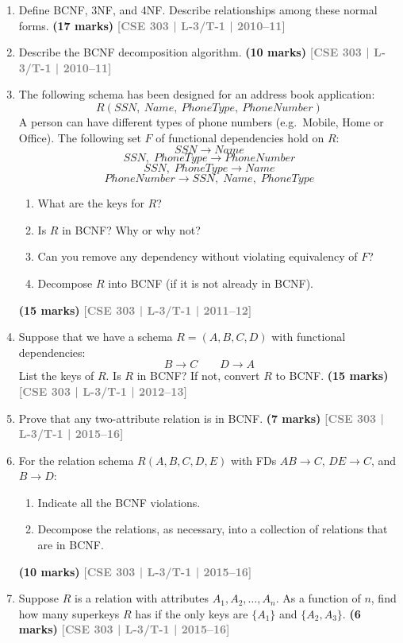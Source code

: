 \documentclass[12pt,a3paper]{article}
\newcommand{\yr}[1]{\hfill\textcolor{gray}{\small\textbf{[#1]}}}
\newcommand{\mk}[1]{\textcolor{orange!70!black}{\small\textbf{(#1 marks)}}}
\begin{document}
\begin{enumerate}

\item Define BCNF, 3NF, and 4NF. Describe relationships among these normal forms.
\mk{17} \yr{CSE 303 | L-3/T-1 | 2010--11}

\item Describe the BCNF decomposition algorithm.
\mk{10} \yr{CSE 303 | L-3/T-1 | 2010--11}

\item The following schema has been designed for an address book application:
\[R(SSN,\ Name,\ PhoneType,\ PhoneNumber)\]
A person can have different types of phone numbers (e.g.\ Mobile, Home or Office). The following set $F$ of functional dependencies hold on $R$:
\[SSN \to Name\]
\[SSN,\;PhoneType \to PhoneNumber\]
\[SSN,\;PhoneType \to Name\]
\[PhoneNumber \to SSN,\;Name,\;PhoneType\]
\begin{enumerate}
  \item What are the keys for $R$?
  \item Is $R$ in BCNF? Why or why not?
  \item Can you remove any dependency without violating equivalency of $F$?
  \item Decompose $R$ into BCNF (if it is not already in BCNF).
\end{enumerate}
\mk{15} \yr{CSE 303 | L-3/T-1 | 2011--12}

\item Suppose that we have a schema $R = (A, B, C, D)$ with functional dependencies:
\[B \to C \qquad D \to A\]
List the keys of $R$. Is $R$ in BCNF? If not, convert $R$ to BCNF.
\mk{15} \yr{CSE 303 | L-3/T-1 | 2012--13}

\item Prove that any two-attribute relation is in BCNF.
\mk{7} \yr{CSE 303 | L-3/T-1 | 2015--16}

\item For the relation schema $R(A, B, C, D, E)$ with FDs $AB \to C$, $DE \to C$, and $B \to D$:
\begin{enumerate}
  \item Indicate all the BCNF violations.
  \item Decompose the relations, as necessary, into a collection of relations that are in BCNF.
\end{enumerate}
\mk{10} \yr{CSE 303 | L-3/T-1 | 2015--16}

\item Suppose $R$ is a relation with attributes $A_1, A_2, \ldots, A_n$. As a function of $n$, find how many superkeys $R$ has if the only keys are $\{A_1\}$ and $\{A_2, A_3\}$.
\mk{6} \yr{CSE 303 | L-3/T-1 | 2015--16}


\end{enumerate}
\end{document}
